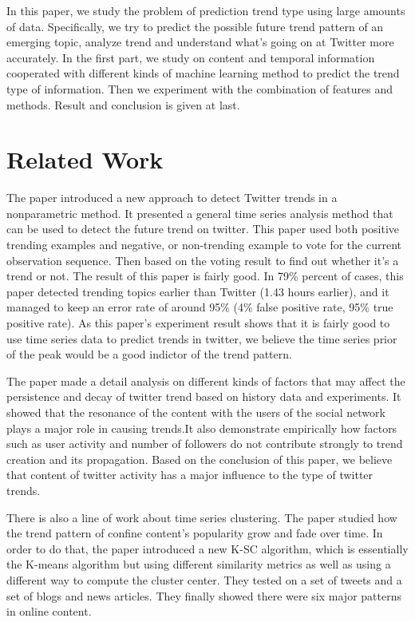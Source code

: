 \documentclass{article}
\begin{document}
In this paper, we study the problem of prediction trend type using large amounts of data. Specifically, we try to predict the possible future trend pattern of an emerging topic, analyze trend and understand what's going on at Twitter more accurately. In the first part, we study on content and temporal information cooperated with different kinds of machine learning method to predict the trend type of information. Then we experiment with the combination of features and methods. Result and conclusion is given at last.
\label{submission}



\section{Related Work} 
The paper \cite{nikolov2012trend} introduced a new approach to detect Twitter trends in a nonparametric method. It presented a general time series analysis method that can be used to detect the future trend on twitter. This paper used both positive trending examples and negative, or non-trending example to vote for the current observation sequence. Then based on the voting result to find out whether it's a trend or not. The result of this paper is fairly good. In 79\% percent of cases, this paper detected trending topics earlier than Twitter (1.43 hours earlier), and it managed to keep an error rate of around 95\% (4\% false positive rate, 95\% true positive rate). As this paper's experiment result shows that it is fairly good to use time series data to predict trends in twitter, we believe the time series prior of the peak would be a good indictor of the trend pattern.
 
The paper \cite{journals/corr/abs-1102-1402} made a detail analysis on different kinds of factors that may affect the persistence and decay of twitter trend based on history data and experiments. It showed that the resonance of the content with the users of the social network plays a major role in causing trends.It also demonstrate empirically how factors such
as user activity and number of followers do not contribute strongly to trend creation and its propagation. Based on the conclusion of this paper, we believe that content of twitter activity has a major influence to the type of twitter trends.

There is also a line of work about time series clustering. The paper \cite{Yang11} studied how the trend pattern of confine content's popularity grow and fade over time. In order to do that, the paper introduced a new K-SC algorithm, which is essentially the K-means algorithm but using different similarity metrics as well as using a different way to compute the cluster center.  They tested on a set of tweets and a set of blogs and news articles. They finally showed there were six major patterns in online content.  
\end{document}
